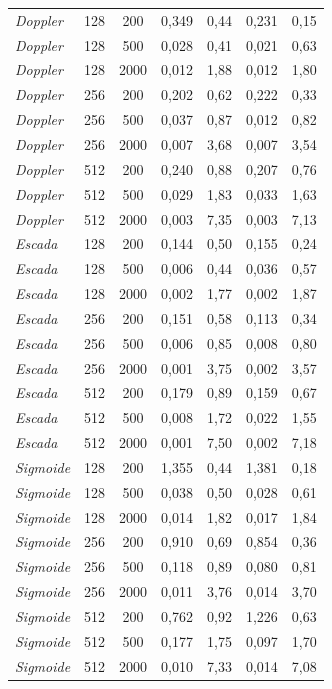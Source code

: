 {\begin{longtable}{@{}lccrrrr@{}}
\emph{Doppler} & 128 & 200 & 0{,}349 & 0{,}44 & 0{,}231 & 0{,}15 \\
\emph{Doppler} & 128 & 500 & 0{,}028 & 0{,}41 & 0{,}021 & 0{,}63 \\
\emph{Doppler} & 128 & 2000 & 0{,}012 & 1{,}88 & 0{,}012 & 1{,}80 \\
\emph{Doppler} & 256 & 200 & 0{,}202 & 0{,}62 & 0{,}222 & 0{,}33 \\
\emph{Doppler} & 256 & 500 & 0{,}037 & 0{,}87 & 0{,}012 & 0{,}82 \\
\emph{Doppler} & 256 & 2000 & 0{,}007 & 3{,}68 & 0{,}007 & 3{,}54 \\
\emph{Doppler} & 512 & 200 & 0{,}240 & 0{,}88 & 0{,}207 & 0{,}76 \\
\emph{Doppler} & 512 & 500 & 0{,}029 & 1{,}83 & 0{,}033 & 1{,}63 \\
\emph{Doppler} & 512 & 2000 & 0{,}003 & 7{,}35 & 0{,}003 & 7{,}13 \\
\emph{Escada} & 128 & 200 & 0{,}144 & 0{,}50 & 0{,}155 & 0{,}24 \\
\emph{Escada} & 128 & 500 & 0{,}006 & 0{,}44 & 0{,}036 & 0{,}57 \\
\emph{Escada} & 128 & 2000 & 0{,}002 & 1{,}77 & 0{,}002 & 1{,}87 \\
\emph{Escada} & 256 & 200 & 0{,}151 & 0{,}58 & 0{,}113 & 0{,}34 \\
\emph{Escada} & 256 & 500 & 0{,}006 & 0{,}85 & 0{,}008 & 0{,}80 \\
\emph{Escada} & 256 & 2000 & 0{,}001 & 3{,}75 & 0{,}002 & 3{,}57 \\
\emph{Escada} & 512 & 200 & 0{,}179 & 0{,}89 & 0{,}159 & 0{,}67 \\
\emph{Escada} & 512 & 500 & 0{,}008 & 1{,}72 & 0{,}022 & 1{,}55 \\
\emph{Escada} & 512 & 2000 & 0{,}001 & 7{,}50 & 0{,}002 & 7{,}18 \\
\emph{Sigmoide} & 128 & 200 & 1{,}355 & 0{,}44 & 1{,}381 & 0{,}18 \\
\emph{Sigmoide} & 128 & 500 & 0{,}038 & 0{,}50 & 0{,}028 & 0{,}61 \\
\emph{Sigmoide} & 128 & 2000 & 0{,}014 & 1{,}82 & 0{,}017 & 1{,}84 \\
\emph{Sigmoide} & 256 & 200 & 0{,}910 & 0{,}69 & 0{,}854 & 0{,}36 \\
\emph{Sigmoide} & 256 & 500 & 0{,}118 & 0{,}89 & 0{,}080 & 0{,}81 \\
\emph{Sigmoide} & 256 & 2000 & 0{,}011 & 3{,}76 & 0{,}014 & 3{,}70 \\
\emph{Sigmoide} & 512 & 200 & 0{,}762 & 0{,}92 & 1{,}226 & 0{,}63 \\
\emph{Sigmoide} & 512 & 500 & 0{,}177 & 1{,}75 & 0{,}097 & 1{,}70 \\
\emph{Sigmoide} & 512 & 2000 & 0{,}010 & 7{,}33 & 0{,}014 & 7{,}08 \\
\end{longtable}
}

